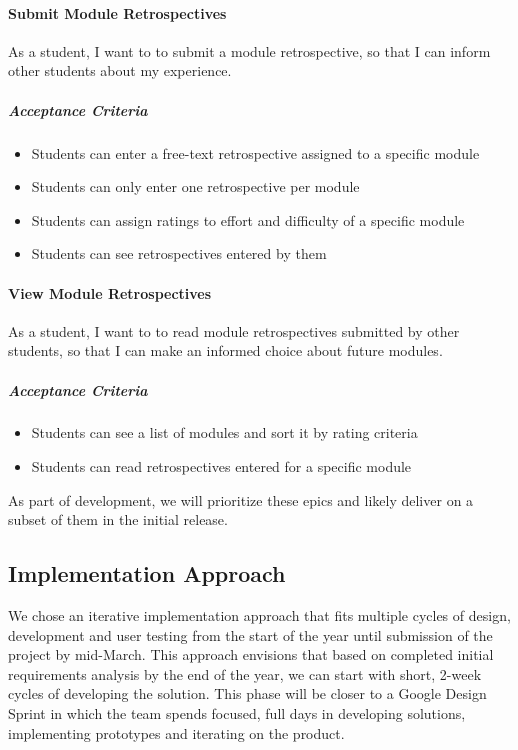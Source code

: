 \paragraph{Submit Module Retrospectives} As a student, I want to to submit a module retrospective, so that I can inform other students about my experience.
\subparagraph{Acceptance Criteria}
\begin{itemize}
    \item Students can enter a free-text retrospective assigned to a specific module
    \item Students can only enter one retrospective per module
    \item Students can assign ratings to effort and difficulty of a specific module
    \item Students can see retrospectives entered by them
\end{itemize}

\paragraph{View Module Retrospectives} As a student, I want to to read module retrospectives submitted by other students, so that I can make an informed choice about future modules.
\subparagraph{Acceptance Criteria}
\begin{itemize}
    \item Students can see a list of modules and sort it by rating criteria
    \item Students can read retrospectives entered for a specific module
\end{itemize}

As part of development, we will prioritize these epics and likely deliver on a subset of them in the initial release.

\subsection{Implementation Approach}

We chose an iterative implementation approach that fits multiple cycles of design, development and user testing from the start of the year until submission of the project by mid-March. This approach envisions that based on completed initial requirements analysis by the end of the year, we can start with short, 2-week cycles of developing the solution. This phase will be closer to a Google Design Sprint in which the team spends focused, full days in developing solutions, implementing prototypes and iterating on the product.


